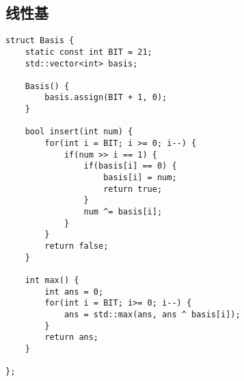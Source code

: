 \subsection{线性基}
\begin{lstlisting}
struct Basis {
    static const int BIT = 21;
    std::vector<int> basis;

    Basis() {
        basis.assign(BIT + 1, 0);
    }

    bool insert(int num) {
        for(int i = BIT; i >= 0; i--) {
            if(num >> i == 1) {
                if(basis[i] == 0) {
                    basis[i] = num;
                    return true;
                }
                num ^= basis[i];
            }
        }
        return false;
    }

    int max() {
        int ans = 0;
        for(int i = BIT; i>= 0; i--) {
            ans = std::max(ans, ans ^ basis[i]);
        }
        return ans;
    }

};
\end{lstlisting}

